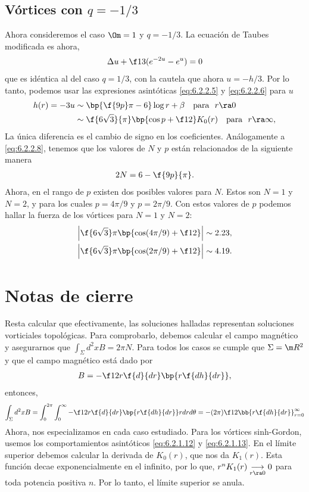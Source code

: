 \newpage

\subsection{Vórtices con $q=-1/3$}

Ahora consideremos el caso $\Om=1$ y $q=-1/3$. La ecuación de Taubes modificada es ahora,
\begin{align}
	\Delta u+\f 13(e^{-2u}-e^{u}) =0
\end{align}
que es idéntica al del caso $q=1/3$, con la cautela que ahora $u=-h/3$. Por lo tanto, podemos usar las expresiones asintóticas \eqref{eq:6.2.2.5} y \eqref{eq:6.2.2.6} para $u$
\begin{align}
	h(r) = -3u &\sim \bp{\f{9p}\pi-6}\log r+\beta \ \ \ \text{para} \ \ r\ra 0 \\
	&\sim \f{6\sqrt 3}{\pi}\bp{\cos p+\f 12}K_0(r) \ \ \ \text{para} \ \ r\ra\infty, 
\end{align}
La única diferencia es el cambio de signo en los coeficientes. Análogamente a \eqref{eq:6.2.2.8}, tenemos que los valores de $N$ y $p$ están relacionados de la siguiente manera
\begin{align}
	2N = 6-\f{9p}{\pi}.
\end{align}
Ahora, en el rango de $p$ existen dos posibles valores para $N$. Estos son $N=1$ y $N=2$, y para los cuales $p=4\pi/9$ y $p=2\pi/9$. Con estos valores de $p$ podemos hallar la fuerza de los vórtices para $N=1$ y $N=2$:
\begin{align}
	\left|\f{6\sqrt 3}\pi\bp{\cos(4\pi/9)+\f 12}\right|\sim 2.23,\\
	\left|\f{6\sqrt 3}\pi\bp{\cos(2\pi/9)+\f 12}\right|\sim 4.19.
\end{align}

\section{Notas de cierre}

Resta calcular que efectivamente, las soluciones halladas representan soluciones vorticiales topológicas. Para comprobarlo, debemos calcular el campo magnético y asegurarnos que $\int_{\Sigma}d^2x B=2\pi N$. Para todos los casos se cumple que $\Sigma=\m R^2$ y que el campo magnético está dado por
\begin{align}
	B= -\f 1{2r}\f{d}{dr}\bp{r\f{dh}{dr}},
\end{align}
entonces,
\begin{align}
	\int_{\Sigma}d^2x B = \int_0^{2\pi}\int_0^\infty-\f 1{2r}\f{d}{dr}\bp{r\f{dh}{dr}} rdrd\theta = -(2\pi)\f 12\bb{r\f{dh}{dr}}_{r=0}^\infty \label{eq:6.3.0.2}
\end{align}
Ahora, nos especializamos en cada caso estudiado. Para los vórtices sinh-Gordon, usemos los comportamientos asintóticos \eqref{eq:6.2.1.12} y \eqref{eq:6.2.1.13}. En el límite superior debemos calcular la derivada de $K_0(r)$, que nos da $K_1(r)$. Esta función decae exponencialmente en el infinito, por lo que, $r^nK_1(r)\underset{r\ra 0}{\longrightarrow} 0$ para toda potencia positiva $n$. Por lo tanto, el límite superior se anula.

